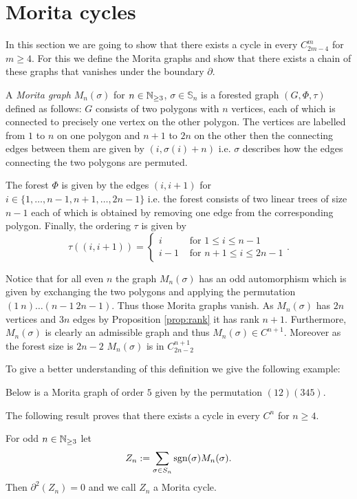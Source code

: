 \section{Morita cycles}\label{sec:MoritaClasses}
In this section we are going to show that there exists a cycle in every $C^{m}_{2m-4}$ for $m \geq 4$.
For this we define the Morita graphs and show that there exists a chain of these graphs that vanishes under the boundary $\partial$.

\begin{definition}
	A \emph{Morita graph} $M_{n}(\sigma)$ for $n \in \mathbb{N}_{\geq 3}$, $\sigma \in \mathbb{S}_{n}$ is a forested graph $(G,\Phi,\tau)$ defined as follows:
	$G$ consists of two polygons with $n$ vertices, each of which is connected to precisely one vertex on the other polygon.
	The vertices are labelled from $1$ to $n$ on one polygon and $n+1$ to $2n$ on the other then the connecting edges between them are given by $(i,\sigma(i)+n)$ i.e.
	$\sigma$ describes how the edges connecting the two polygons are permuted.

	The forest $\Phi$ is given by the edges $(i,i+1)$ for $i \in \{1,\ldots,n-1, n+1,\ldots,2n-1\}$ i.e. the
	forest consists of two linear trees of size $n-1$ each of which is obtained by removing one edge from the corresponding polygon.
	Finally, the ordering $\tau$ is given by
	\[
		\tau((i,i+1)) = \begin{cases}
			i & \text{ for } 1 \leq i \leq n-1\\ 
			i-1 & \text{ for } n+1 \leq i \leq 2n-1
		\end{cases}
	.\] 
\end{definition}
Notice that for all even $n$ the graph $M_{n}(\sigma)$ has an odd automorphism which is given by exchanging the two polygons and applying the permutation $(1\ n) \ldots (n-1\ 2n -1)$.
Thus those Morita graphs vanish.
As $M_{n}(\sigma)$ has $2n$ vertices and $3n$ edges by Proposition \ref{prop:rank} it has rank $n+1$.
Furthermore, $M_{n}(\sigma)$ is clearly an admissible graph and thus $M_{n}(\sigma) \in C^{n+1}$. Moreover as the forest size is $2n-2$ $M_{n}(\sigma)$ is in $C^{n+1}_{2n -2}$

To give a better understanding of this definition we give the following example:
\begin{eg}
	Below is a Morita graph of order $5$ given by the permutation $(12)(345)$.
\end{eg}

The following result proves that there exists a cycle in every $C^{n}$ for $n \geq 4$.
\begin{theorem}
	For odd $n \in \mathbb{N}_{\geq 3}$ let 
	\[
		Z_{n} := \sum_{\sigma \in S_{n}} \operatorname{sgn}(\sigma) M_{n}(\sigma)
	.\] 
	Then $\partial^2(Z_{n}) = 0$ and we call $Z_{n}$ a Morita cycle.
\end{theorem}

